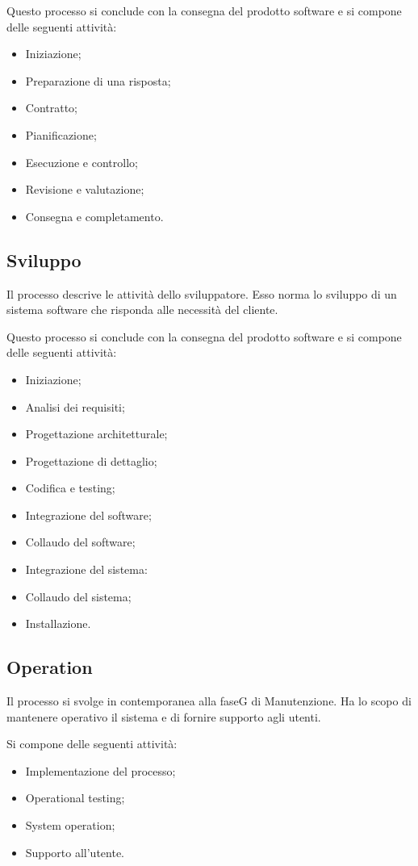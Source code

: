 Questo processo si conclude con la consegna del prodotto software e si compone delle seguenti attività:

\begin{itemize}
    \item Iniziazione;
    \item Preparazione di una risposta;
    \item Contratto;
    \item Pianificazione;
    \item Esecuzione e controllo;
    \item Revisione e valutazione;
    \item Consegna e completamento.
\end{itemize}

\subsection{Sviluppo}

Il processo descrive le attività dello sviluppatore. Esso norma lo sviluppo di un sistema software che risponda alle necessità del cliente.

Questo processo si conclude con la consegna del prodotto software e si compone delle seguenti attività:

\begin{itemize}
    \item Iniziazione;
    \item Analisi dei requisiti;
    \item Progettazione architetturale;
    \item Progettazione di dettaglio;
    \item Codifica e testing;
    \item Integrazione del software;
    \item Collaudo del software;
    \item Integrazione del sistema:
    \item Collaudo del sistema;
    \item Installazione.
\end{itemize}

\subsection{Operation}
Il processo si svolge in contemporanea alla faseG di Manutenzione. Ha lo scopo di mantenere operativo il sistema e di fornire supporto agli utenti.

Si compone delle seguenti attività:
\begin{itemize}
    \item Implementazione del processo;
    \item Operational testing;
    \item System operation;
    \item Supporto all'utente.
\end{itemize}


